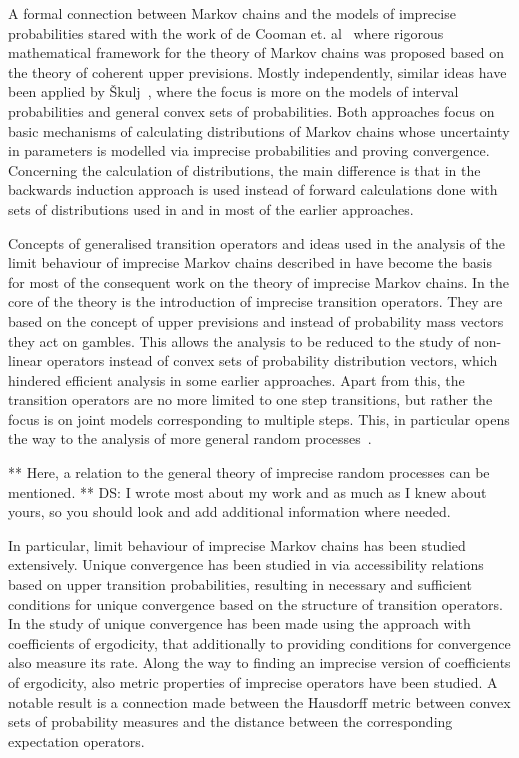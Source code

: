 \documentclass[11pt,dvipsnames,usenames,a4paper]{article}
\begin{document}
A formal connection between Markov chains and the models of imprecise probabilities stared with the work of de Cooman et. al~\cite{cooman2008} where rigorous mathematical framework for the theory of Markov chains was proposed based on the theory of coherent upper previsions. Mostly independently, similar ideas have been applied by Škulj~\cite{skulj:09}, where the focus is more on the models of interval probabilities and general convex sets of probabilities. Both approaches focus on basic mechanisms of calculating distributions of Markov chains whose uncertainty in parameters is modelled via imprecise probabilities and proving convergence. Concerning the calculation of distributions, the main difference is that in \cite{cooman2008} the backwards induction approach is used instead of forward calculations done with sets of distributions used in \cite{skulj:09} and in most of the earlier approaches. 


Concepts of generalised transition operators and ideas used in the analysis of the limit behaviour of imprecise Markov chains described in \cite{cooman2008} have become the basis for most of the consequent work on the theory of imprecise Markov chains. In the core of the theory is the introduction of imprecise transition operators. They are based on the concept of upper previsions and instead of probability mass vectors they act on gambles. This allows the analysis to be reduced to the study of non-linear operators instead of convex sets of probability distribution vectors, which hindered efficient analysis in some earlier approaches. Apart from this, the transition operators are no more limited to one step transitions, but rather the focus is on joint models corresponding to multiple steps. This, in particular opens the way to the analysis of more general random processes~\cite{cooman2015:markovergodic}.

** Here, a relation to the general theory of imprecise random processes can be mentioned. 
** DS: I wrote most about my work and as much as I knew about yours, so you should look and add additional information where needed. 

In particular, limit behaviour of imprecise Markov chains has been studied extensively. Unique convergence has been studied in \cite{cooman2008, cooman2010} via accessibility relations based on upper transition probabilities, resulting in necessary and sufficient conditions for unique convergence based on the structure of transition operators.
In \cite{skulj2013} the study of unique convergence has been made using the approach with coefficients of ergodicity, that additionally to providing conditions for convergence also measure its rate. Along the way to finding an imprecise version of coefficients of ergodicity, also metric properties of imprecise operators have been studied. A notable result is a connection made between the Hausdorff metric between convex sets of probability measures and the distance between the corresponding expectation operators. 
\end{document}
